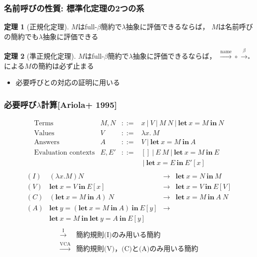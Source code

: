 \documentclass[dvipdfmx,cjk,xcolor=dvipsnames,envcountsect,notheorems,12pt]{beamer}
\theoremstyle{definition}
\newtheorem{theorem}{定理}
\newcommand{\LET}[3]{\mathbf{let}~#1=#2~\mathbf{in}~#3}
\newcommand{\FULLBETA}{\xrightarrow{\beta}}
\newcommand{\CALLBYNEEDI}{\xrightarrow{\mathrm{I}}}
\newcommand{\CALLBYNEEDVCA}{\xrightarrow{\mathrm{VCA}}}
\newcommand{\CALLBYNAME}{\xrightarrow{\mathrm{name}}}
\newcommand{\RTCLOS}[1]{#1_*}
\begin{document}
\begin{frame}
	\frametitle{名前呼びの性質: 標準化定理の2つの系}
	\large
	\begin{theorem}[正規化定理]
		$M$はfull-$\beta$簡約で$\lambda$抽象に評価できるならば，
		$M$は名前呼びの簡約でも$\lambda$抽象に評価できる
	\end{theorem}
	\begin{theorem}[準正規化定理]
		$M$はfull-$\beta$簡約で$\lambda$抽象に評価できるならば，
		${\CALLBYNAME}\circ{\RTCLOS{\FULLBETA}}$による$M$の簡約は必ず止まる
	\end{theorem}
	\begin{itemize}
		\item 必要呼びとの対応の証明に用いる
	\end{itemize}
\end{frame}

\begin{frame}
	\frametitle{必要呼び$\lambda$計算[Ariola+ 1995]}
	{\normalsize
		\[\begin{array}{llcl}
			\mbox{Terms} & M,N & ::= & x~|~V~|~M~N~|~\LET{x}{M}{N} \\
			\mbox{Values} & V & ::= & \lambda x.~M \\
			\mbox{Answers} & A & ::= & V~|~\LET{x}{M}{A} \\
			\mbox{Evaluation contexts} & E,E' & ::= & [] ~|~ E~M ~|~\LET{x}{M}{E} \\
			& & & ~|~ \LET{x}{E}{E'[x]} \\
		\end{array}\] }
	{\normalsize
		\[ \begin{array}{lrcl}
			(I) & (\lambda x.M)N & \rightarrow & \LET{x}{N}{M} \\
			(V) & \LET{x}{V}{E[x]} & \rightarrow & \LET{x}{V}{E[V]} \\
			(C) & (\LET{x}{M}{A})~N & \rightarrow & \LET{x}{M}{A~N} \\
			(A) & \LET{y}{(\LET{x}{M}{A})}{E[y]} & \rightarrow \\
			& \LET{x}{M}{\LET{y}{A}{E[y]}} & \\
		\end{array} \]}
	{\normalsize
		\[ \begin{array}{ll}
			\CALLBYNEEDI & \mbox{簡約規則(I)のみ用いる簡約}\\
			\CALLBYNEEDVCA & \mbox{簡約規則(V)，(C)と(A)のみ用いる簡約}\\
		\end{array} \]}
\end{frame}
\end{document}
